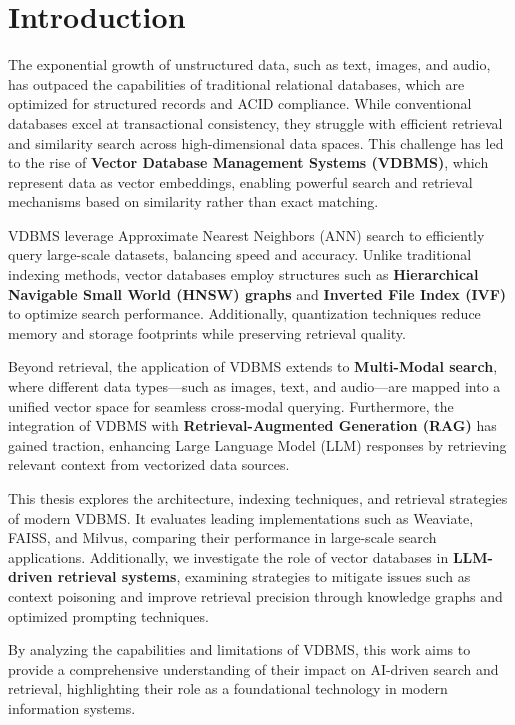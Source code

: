 \pagestyle{fancy}
\chapter*{Introduction}
\pagestyle{fancy}
The exponential growth of unstructured data, such as text, images, and audio, has outpaced the capabilities of traditional relational databases, which are optimized for structured records and ACID compliance. While conventional databases excel at transactional consistency, they struggle with efficient retrieval and similarity search across high-dimensional data spaces. This challenge has led to the rise of \textbf{Vector Database Management Systems (VDBMS)}, which represent data as vector embeddings, enabling powerful search and retrieval mechanisms based on similarity rather than exact matching.  

VDBMS leverage Approximate Nearest Neighbors (ANN) search to efficiently query large-scale datasets, balancing speed and accuracy. Unlike traditional indexing methods, vector databases employ structures such as \textbf{Hierarchical Navigable Small World (HNSW) graphs} and \textbf{Inverted File Index (IVF)} to optimize search performance. Additionally, quantization techniques reduce memory and storage footprints while preserving retrieval quality.  

Beyond retrieval, the application of VDBMS extends to \textbf{Multi-Modal search}, where different data types—such as images, text, and audio—are mapped into a unified vector space for seamless cross-modal querying. Furthermore, the integration of VDBMS with \textbf{Retrieval-Augmented Generation (RAG)} has gained traction, enhancing Large Language Model (LLM) responses by retrieving relevant context from vectorized data sources.  

This thesis explores the architecture, indexing techniques, and retrieval strategies of modern VDBMS. It evaluates leading implementations such as Weaviate, FAISS, and Milvus, comparing their performance in large-scale search applications. Additionally, we investigate the role of vector databases in \textbf{LLM-driven retrieval systems}, examining strategies to mitigate issues such as context poisoning and improve retrieval precision through knowledge graphs and optimized prompting techniques.  

By analyzing the capabilities and limitations of VDBMS, this work aims to provide a comprehensive understanding of their impact on AI-driven search and retrieval, highlighting their role as a foundational technology in modern information systems.  
